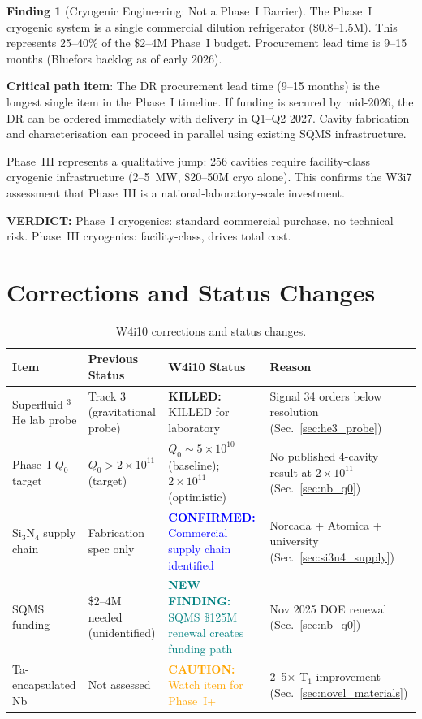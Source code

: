 \documentclass[11pt]{article}
\theoremstyle{definition}
\newtheorem{finding}[theorem]{Finding}
\theoremstyle{remark}
\newcommand{\ee}[1]{\times 10^{#1}}
\newcommand{\confirmed}[1]{\textcolor{blue}{\textbf{CONFIRMED:} #1}}
\newcommand{\caution}[1]{\textcolor{orange}{\textbf{CAUTION:} #1}}
\newcommand{\killed}[1]{\textcolor{red!70!black}{\textbf{KILLED:} #1}}
\newcommand{\verdict}[1]{\textcolor{green!50!black}{\textbf{VERDICT:} #1}}
\newcommand{\newfinding}[1]{\textcolor{teal}{\textbf{NEW FINDING:} #1}}
\begin{document}
\begin{finding}[Cryogenic Engineering: Not a Phase~I Barrier]
\label{find:cryo_barrier}
The Phase~I cryogenic system is a single commercial dilution
refrigerator (\$0.8--1.5M). This represents 25--40\% of the
\$2--4M Phase~I budget. Procurement lead time is 9--15 months
(Bluefors backlog as of early 2026).

\textbf{Critical path item}: The DR procurement lead time
(9--15 months) is the longest single item in the Phase~I timeline.
If funding is secured by mid-2026, the DR can be ordered immediately
with delivery in Q1--Q2 2027. Cavity fabrication and characterisation
can proceed in parallel using existing SQMS infrastructure.

Phase~III represents a qualitative jump: 256 cavities require
facility-class cryogenic infrastructure (2--5~MW, \$20--50M cryo
alone). This confirms the W3i7 assessment that Phase~III is a
national-laboratory-scale investment.

\verdict{Phase~I cryogenics: standard commercial purchase, no
technical risk. Phase~III cryogenics: facility-class, drives
total cost.}
\end{finding}


\section{Corrections and Status Changes}
\label{sec:corrections}

\begin{table}[H]
\centering
\caption{W4i10 corrections and status changes.}
\label{tab:corrections}
\renewcommand{\arraystretch}{1.3}
\begin{tabular}{p{4cm}p{3cm}p{3cm}p{3cm}}
\toprule
\textbf{Item} & \textbf{Previous Status} & \textbf{W4i10 Status} &
\textbf{Reason} \\
\midrule
Superfluid $^3$He lab probe &
  Track 3 (gravitational probe) &
  \killed{KILLED for laboratory} &
  Signal 34 orders below resolution (Sec.~\ref{sec:he3_probe}) \\
Phase~I $Q_0$ target &
  $Q_0 > 2\ee{11}$ (target) &
  $Q_0 \sim 5\ee{10}$ (baseline); $2\ee{11}$ (optimistic) &
  No published 4-cavity result at $2\ee{11}$ (Sec.~\ref{sec:nb_q0}) \\
Si$_3$N$_4$ supply chain &
  Fabrication spec only &
  \confirmed{Commercial supply chain identified} &
  Norcada + Atomica + university (Sec.~\ref{sec:si3n4_supply}) \\
SQMS funding &
  \$2--4M needed (unidentified) &
  \newfinding{SQMS \$125M renewal creates funding path} &
  Nov 2025 DOE renewal (Sec.~\ref{sec:nb_q0}) \\
Ta-encapsulated Nb &
  Not assessed &
  \caution{Watch item for Phase~I+} &
  2--5$\times$ T$_1$ improvement (Sec.~\ref{sec:novel_materials}) \\
\bottomrule
\end{tabular}
\end{table}
\end{document}
